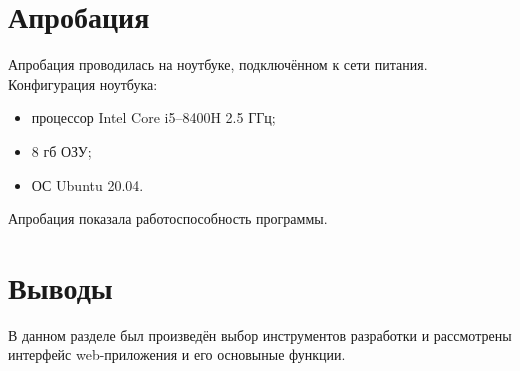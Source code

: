 \section{Апробация}%
\label{sec:aprobatsiia}
Апробация проводилась на ноутбуке, подключённом к сети питания. Конфигурация ноутбука:
\begin{itemize}
    \item процессор Intel Core i5--8400H 2.5 ГГц;
    \item 8 гб ОЗУ;
    \item ОС Ubuntu 20.04.
\end{itemize}

Апробация показала работоспособность программы.

\section{Выводы}%
\label{sec:vyvody_impl}

В данном разделе был произведён выбор инструментов разработки и рассмотрены интерфейс web-приложения и его основыные функции.

